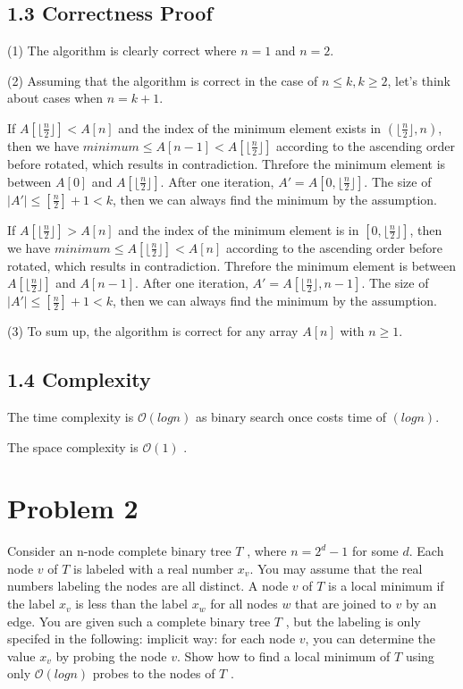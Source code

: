 \documentclass[UTF8]{ctexart}
\begin{document}
\subsection*{1.3 Correctness Proof } 
(1) The algorithm is clearly correct where $ n = 1 $ and $n = 2$.

(2) Assuming that the algorithm is correct in the case of $n \leq k , k \geq 2$, let's think about cases when $ n = k + 1$.

If $ A[\lfloor \frac{n}{2} \rfloor] < A[n] $ and the index of the minimum element exists in $ (\lfloor \frac{n}{2} \rfloor, n) $, 
then we have $minimum \leq A[n-1] < A[\lfloor \frac{n}{2} \rfloor]$ according to the ascending order before rotated, which results in contradiction.
Threfore the minimum element is between $A[0]$ and $A[\lfloor \frac{n}{2} \rfloor]$. After one iteration, $A' = A[0, \lfloor \frac{n}{2} \rfloor]$.
The size of $\mid A'\mid \leq [\frac{n}{2}] + 1 < k $, then we can always find the minimum by the assumption.

If $ A[\lfloor \frac{n}{2} \rfloor] > A[n] $ and the index of the minimum element is in $ [0, \lfloor \frac{n}{2} \rfloor] $, 
then we have $minimum \leq A[\lfloor \frac{n}{2} \rfloor] < A[n]$ according to the ascending order before rotated, which results in contradiction.
Threfore the minimum element is between $A[\lfloor \frac{n}{2} \rfloor]$ and $A[n-1]$. After one iteration, $A' = A[\lfloor \frac{n}{2} \rfloor, n-1]$.
The size of $\mid A'\mid \leq [\frac{n}{2}] + 1 < k $, then we can always find the minimum by the assumption.

(3) To sum up, the algorithm is correct for any array $A[n]$ with $n \geq 1$.

\subsection*{1.4 Complexity}  
The time complexity is $\mathcal{O}(log n)$ as binary search once costs time of $(logn)$.

The space complexity is $\mathcal{O}(1)$ .

\section*{Problem 2}
Consider an n-node complete binary tree $T$ , where $n = 2^d - 1$ for some $d$. Each node $v$ of
$T$ is labeled with a real number $x_v$. You may assume that the real numbers labeling the nodes
are all distinct. A node $v$ of $T$ is a local minimum if the label $x_v$ is less than the label $x_w$ for
all nodes $w$ that are joined to $v$ by an edge. 
You are given such a complete binary tree $T$ , but the labeling is only specifed in the following:
implicit way: for each node $v$, you can determine the value $x_v$ by probing the node $v$.
Show how to find a local minimum of $T$ using only $\mathcal{O}(logn)$ probes to the nodes of $T$ .
\end{document}
